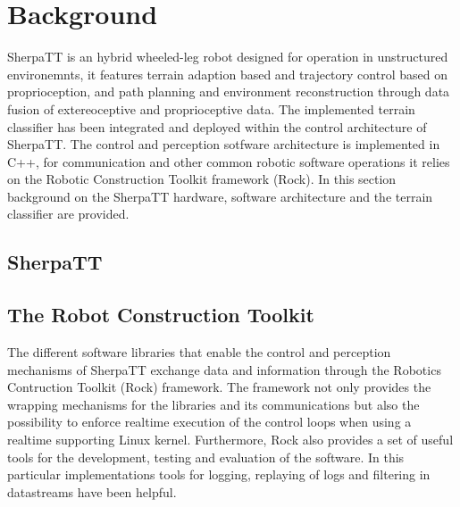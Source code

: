 \documentclass{article}
\begin{document}

\section{Background}


SherpaTT is an hybrid wheeled-leg robot designed for operation in unstructured environemnts, it features terrain adaption based and trajectory control based on proprioception, and path planning and environment reconstruction through data fusion of extereoceptive and proprioceptive data.
The implemented terrain classifier has been integrated and deployed within the control architecture of SherpaTT. 
The control and perception sotfware architecture is implemented in C++, for communication and other common robotic software operations it relies on the Robotic Construction Toolkit framework (Rock). 
In this section background on the SherpaTT hardware, software architecture and the terrain classifier are provided.


\subsection{SherpaTT}

\subsection{The Robot Construction Toolkit}
The different software libraries that enable the control and perception mechanisms of SherpaTT exchange data and information through the Robotics Contruction Toolkit (Rock) framework.
The framework not only provides the wrapping mechanisms for the libraries and its communications but also the possibility to enforce realtime execution of the control loops when using a realtime supporting Linux kernel.
Furthermore, Rock also provides a set of useful tools for the development, testing and evaluation of the software. 
In this particular implementations tools for logging, replaying of logs and filtering in datastreams have been helpful.
\end{document}
